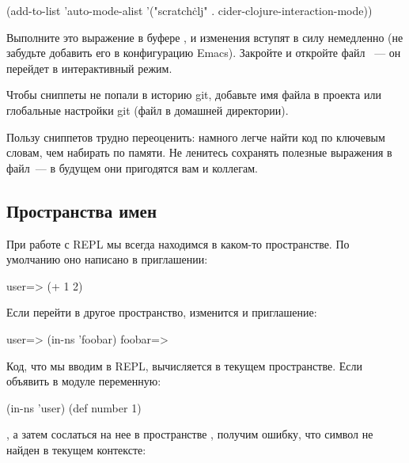 \begin{english}
  \begin{lisp}
(add-to-list 'auto-mode-alist '("scratch\.clj" . cider-clojure-interaction-mode))
  \end{lisp}
\end{english}

Выполните это выражение в буфере , и изменения вступят в силу немедленно (не забудьте добавить его в конфигурацию Emacs). Закройте и откройте файл ~--- он перейдет в интерактивный режим.

Чтобы сниппеты не попали в историю git, добавьте имя файла в  проекта или глобальные настройки git (файл  в домашней директории).

Пользу сниппетов трудно переоценить: намного легче найти код по ключевым словам, чем набирать по памяти. Не ленитесь сохранять полезные выражения в файл~--- в будущем они пригодятся вам и коллегам.

\subsection{Пространства имен}

При работе с REPL мы всегда находимся в каком-то пространстве. По умолчанию оно написано в приглашении:

\begin{english}
  \begin{clojure}
user=> (+ 1 2)
  \end{clojure}
\end{english}

Если перейти в другое пространство, изменится и приглашение:

\begin{english}
  \begin{clojure}
user=> (in-ns 'foobar)
foobar=>
  \end{clojure}
\end{english}

Код, что мы вводим в REPL, вычисляется в текущем пространстве. Если объявить в модуле  переменную:

\begin{english}
  \begin{clojure}
(in-ns 'user)
(def number 1)
  \end{clojure}
\end{english}

, а затем сослаться на нее в пространстве , получим ошибку, что символ  не найден в текущем контексте:

